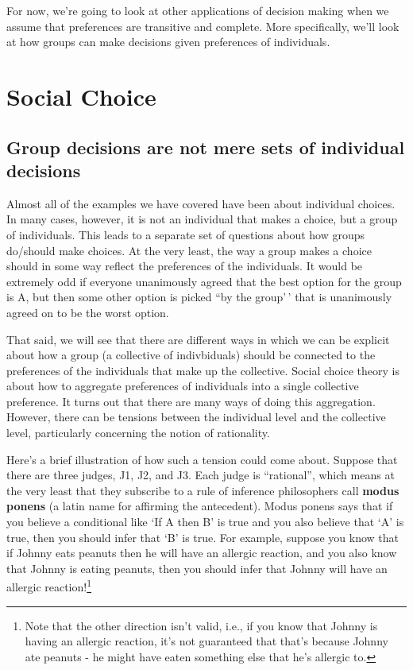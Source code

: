 \documentclass[]{tufte-book}
\begin{document}
For now, we're going to look at other applications of decision making when we assume that preferences are transitive and complete. More specifically, we'll look at how groups can make decisions given preferences of individuals.

\hypertarget{social-choice}{%
\section{Social Choice}\label{social-choice}}

\hypertarget{group-decisions-are-not-mere-sets-of-individual-decisions}{%
\subsection{Group decisions are not mere sets of individual decisions}\label{group-decisions-are-not-mere-sets-of-individual-decisions}}

Almost all of the examples we have covered have been about individual choices. In many cases, however, it is not an individual that makes a choice, but a group of individuals. This leads to a separate set of questions about how groups do/should make choices. At the very least, the way a group makes a choice should in some way reflect the preferences of the individuals. It would be extremely odd if everyone unanimously agreed that the best option for the group is A, but then some other option is picked ``by the group'\,' that is unanimously agreed on to be the worst option.

That said, we will see that there are different ways in which we can be explicit about how a group (a collective of indivbiduals) should be connected to the preferences of the individuals that make up the collective. Social choice theory is about how to aggregate preferences of individuals into a single collective preference. It turns out that there are many ways of doing this aggregation. However, there can be tensions between the individual level and the collective level, particularly concerning the notion of rationality.

Here's a brief illustration of how such a tension could come about. Suppose that there are three judges, J1, J2, and J3. Each judge is ``rational'', which means at the very least that they subscribe to a rule of inference philosophers call \textbf{modus ponens} (a latin name for affirming the antecedent). Modus ponens says that if you believe a conditional like `If A then B' is true and you also believe that `A' is true, then you should infer that `B' is true. For example, suppose you know that if Johnny eats peanuts then he will have an allergic reaction, and you also know that Johnny is eating peanuts, then you should infer that Johnny will have an allergic reaction!\footnote{Note that the other direction isn't valid, i.e., if you know that Johnny is having an allergic reaction, it's not guaranteed that that's because Johnny ate peanuts - he might have eaten something else that he's allergic to.}
\end{document}
